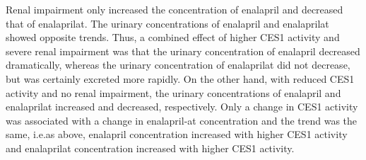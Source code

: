 \documentclass[pharmaceutics,article,submit,pdftex,moreauthors]{Definitions/mdpi}
\begin{document}
Renal impairment only increased the concentration of enalapril and decreased that of enalaprilat. The urinary concentrations of ena\-lapril and enalaprilat showed opposite trends. Thus, a combined effect of higher CES1 activity and severe renal impairment was that the urinary concentration of enalapril decreased dramatically, whereas the urinary concentration of enalaprilat did not decrease, but was certainly excreted more rapidly. On the other hand, with reduced CES1 activity and no renal impairment, the urinary concentrations of enalapril and enalaprilat increased and decreased, respectively. Only a change in CES1 activity was associated with a change in enalapril-at concentration and the trend was the same, i.e.\@ as above, enalapril concentration increased with higher CES1 activity and enalaprilat concentration increased with higher CES1 activity.


\end{document}
